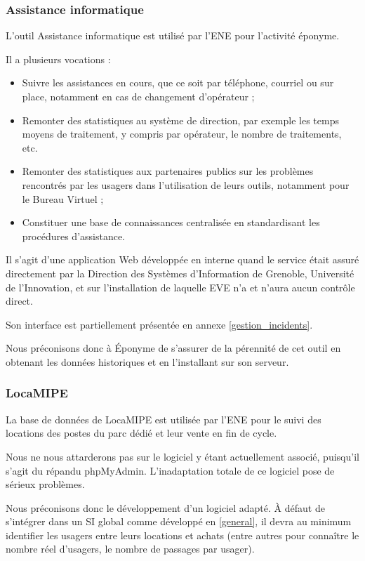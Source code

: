 \subsubsection{Assistance informatique}

L'outil Assistance informatique est utilisé par l'ENE pour l'activité éponyme.

Il a plusieurs vocations :
\begin{itemize}
\item Suivre les assistances en cours, que ce soit par téléphone,
      courriel ou sur place, notamment en cas de changement d'opérateur ;
\item Remonter des statistiques au système de direction, par exemple les temps
      moyens de traitement, y compris par opérateur, le nombre de traitements,
      etc.
\item Remonter des statistiques aux partenaires publics sur les problèmes
      rencontrés par les usagers dans l'utilisation de leurs outils, notamment
      pour le Bureau Virtuel ;
\item Constituer une base de connaissances centralisée en standardisant les
      procédures d'assistance.
\end{itemize}

Il s'agit d'une application Web développée en interne quand le service était
assuré directement par la Direction des Systèmes d'Information de Grenoble,
Université de l'Innovation, et sur l'installation de laquelle EVE n'a et
n'aura aucun contrôle direct.

Son interface est partiellement présentée en annexe \ref{gestion_incidents}.

Nous préconisons donc à Éponyme de s'assurer de la pérennité de cet outil
en obtenant les données historiques et en l'installant sur son serveur.

\subsubsection{LocaMIPE}

La base de données de LocaMIPE est utilisée par l'ENE pour le suivi des
locations des postes du parc dédié et leur vente en fin de cycle.

Nous ne nous attarderons pas sur le logiciel y étant actuellement associé,
puisqu'il s'agit du répandu phpMyAdmin. L'inadaptation totale de ce logiciel
pose de sérieux problèmes.

Nous préconisons donc le développement d'un logiciel adapté. À défaut
de s'intégrer dans un SI global comme développé en \ref{general}, il
devra au minimum identifier les usagers entre leurs locations et achats
(entre autres pour connaître le nombre réel d'usagers, le nombre de passages
par usager).

